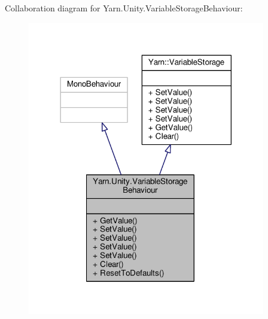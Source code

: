 Collaboration diagram for Yarn.\-Unity.\-Variable\-Storage\-Behaviour\-:
\nopagebreak
\begin{figure}[H]
\begin{center}
\leavevmode
\includegraphics[width=294pt]{a00699}
\end{center}
\end{figure}
